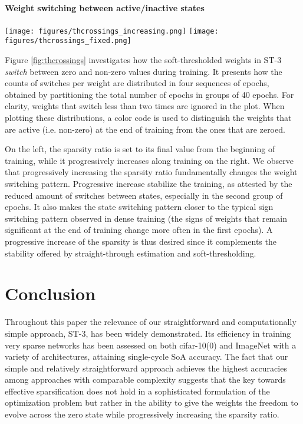 \documentclass[10pt,twocolumn,letterpaper]{article}
\begin{document}
\paragraph{Weight switching between active/inactive states}
\begin{figure*}[t]
    
  \centering
    \texttt{[image: figures/thcrossings\_increasing.png]}
    \texttt{[image: figures/thcrossings\_fixed.png]}
  \caption{\textit{(best viewed in color)} Number of switches between active and inactive state for the weights of a ResNet-20 trained with ST-3 for 160 epochs on Cifar-10 at 90\% sparsity. The global sparsity ratio is fixed (left) or cubicly increasing (right). (Weights that switch once or never are not included)}
  \label{fig:thcrossings}
\end{figure*}

Figure \ref{fig:thcrossings} investigates how the soft-thresholded weights in ST-3 \emph{switch} between zero and non-zero values during training. It presents how the counts of switches per weight are distributed in four sequences of epochs, obtained by partitioning the total number of epochs in groups of 40 epochs.  For clarity, weights that switch less than two times are ignored in the plot. When plotting these distributions, a color code is used to distinguish the weights that  are active (i.e. non-zero) at the end of training from the ones that are zeroed.


On the left, the sparsity ratio is set to its final value from the beginning of training, while it progressively increases along training on the right.
We observe that progressively increasing the sparsity ratio fundamentally changes the weight switching pattern. Progressive increase stabilize the training, as attested by the reduced amount of switches between states, especially in the second group of epochs. It also makes the state switching pattern closer to the typical sign switching pattern observed in dense training (the signs of weights that remain significant at the end of training change more often in the first epochs). A progressive increase of the sparsity is thus desired since it complements the stability offered by straight-through estimation and soft-thresholding. \\


\section{Conclusion}
Throughout this paper the relevance of our straightforward and computationally simple approach, ST-3, has been widely demonstrated. Its efficiency in training very sparse networks has been assessed on both cifar-10(0) and ImageNet with a variety of architectures, attaining single-cycle SoA accuracy. The fact that our simple and relatively straightforward approach achieves the highest accuracies among approaches with comparable complexity suggests that the key towards effective sparsification does not hold in a sophisticated formulation of the optimization problem but rather in the ability to give the weights the freedom to evolve across the zero state while progressively increasing the sparsity ratio.
\end{document}
